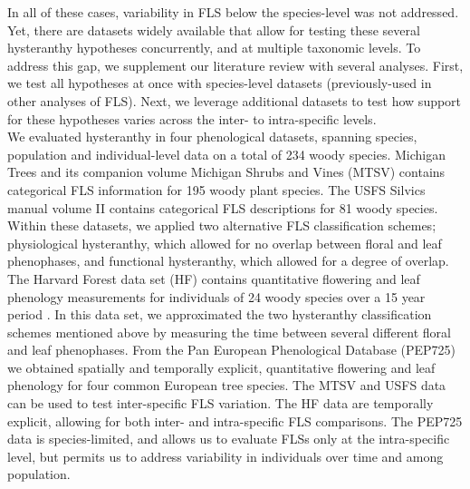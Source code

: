 \documentclass[12pt]{article}
\begin{document}
\indent In all of these cases, variability in FLS below the species-level was not addressed. Yet, there are datasets widely available that allow for testing these several hysteranthy hypotheses concurrently, and at multiple taxonomic levels. To address this gap, we supplement our literature review with several analyses. First, we test all hypotheses at once with species-level datasets (previously-used in other analyses of FLS). Next, we leverage additional datasets to test how support for these hypotheses varies across the inter- to intra-specific levels.\\ 

\indent We evaluated hysteranthy in four phenological datasets, spanning species, population and individual-level data on a total of 234 woody species. Michigan Trees and its companion volume Michigan Shrubs and Vines \citep{Barnes2004,Barnes2016} (MTSV) contains categorical FLS information for 195 woody plant species. The USFS Silvics manual volume II \citep{Burns1990} contains categorical FLS descriptions for 81 woody species. Within these datasets, we applied two alternative FLS classification schemes; physiological hysteranthy, which allowed for no overlap between floral and leaf phenophases, and functional hysteranthy, which allowed for a degree of overlap. The Harvard Forest data set (HF) contains quantitative flowering and leaf phenology measurements for individuals of 24 woody species over a 15 year period \citep{OKeefe2015}. In this data set, we approximated the two hysteranthy classification schemes mentioned above by measuring the time between several different floral and leaf phenophases. From the Pan European Phenological Database (PEP725) \citep{PEP725} we obtained spatially and temporally explicit, quantitative flowering and leaf phenology for four common European tree species. The MTSV and USFS data can be used to test inter-specific FLS variation. The HF data are temporally explicit, allowing for both inter- and intra-specific FLS comparisons. The PEP725 data is species-limited, and allows us to evaluate FLSs only at the intra-specific level, but permits us to address variability in individuals over time and among population.\\
\end{document}
